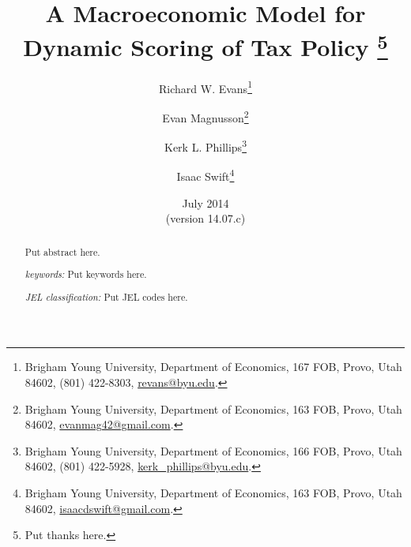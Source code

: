 \documentclass[letterpaper,12pt]{article}
\theoremstyle{definition}
\begin{document}
\begin{titlepage}
\title{A Macroeconomic Model for \\
       Dynamic Scoring of Tax Policy
       \thanks{
       Put thanks here.}
       }
\author{
  Richard W. Evans\footnote{Brigham Young University, Department of Economics, 167 FOB, Provo, Utah 84602, (801) 422-8303, \href{mailto:revans@byu.edu}{revans@byu.edu}.} \\[-2pt]
  \and
  Evan Magnusson\footnote{Brigham Young University, Department of Economics, 163 FOB, Provo, Utah 84602, \href{mailto:evanmag42@gmail.com}{evanmag42@gmail.com}.} \\[-2pt]
  \and
  Kerk L. Phillips\footnote{Brigham Young University, Department of Economics, 166 FOB, Provo, Utah 84602, (801) 422-5928, \href{mailto:kerk_phillips@byu.edu}{kerk\_phillips@byu.edu}.} \\[-2pt]
  \and
  Isaac Swift\footnote{Brigham Young University, Department of Economics, 163 FOB, Provo, Utah 84602, \href{mailto:isaacdswift@gmail.com}{isaacdswift@gmail.com}.} \\[-2pt]}
\date{July 2014 \\
  \scriptsize{(version 14.07.c)}}
\maketitle
\begin{abstract}
\normalsize{Put abstract here.

\vspace{3mm}

\noindent\textit{keywords:}\: Put keywords here.

\vspace{3mm}

\noindent\textit{JEL classification:} Put JEL codes here.}
\end{abstract}
\thispagestyle{empty}
\end{titlepage}
\end{document}

